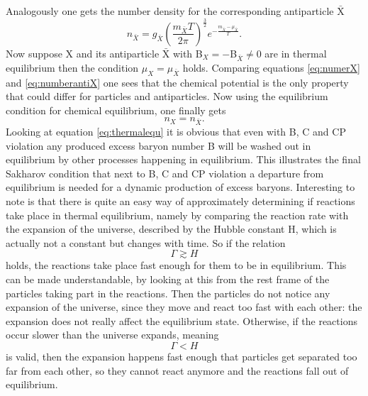 Analogously one gets the number density for the corresponding antiparticle $\bar{\text{X}}$
\begin{equation}
	n_{\bar{X}}=g_{\bar{X}}\left(\frac{m_{\bar{X}}T}{2\pi}\right)^\frac{3}{2}e^{-\frac{m_{\bar{X}}-\mu_{\bar{X}}}{T}}.
\label{eq:numberantiX}
\end{equation}
Now suppose X and its antiparticle $\bar{\text{X}}$  with B$_X=-$B$_{\bar{X}}\neq0$ are in thermal equilibrium then the condition $\mu_X=\mu_{\bar{X}}$ holds. Comparing equations \eqref{eq:numerX} and \eqref{eq:numberantiX} one sees that the chemical potential is the only property that could differ for particles and antiparticles. Now using the equilibrium condition for chemical equilibrium, one finally gets
\begin{equation}
	n_X=n_{\bar{X}}.
	\label{eq:thermalequ}
\end{equation}
Looking at equation \eqref{eq:thermalequ} it is obvious that even with B, C and CP violation any produced excess baryon number B will be washed out in equilibrium by other processes happening in equilibrium. \newline\indent
This illustrates the final Sakharov condition that next to B, C and CP violation a departure from equilibrium is needed for a dynamic production of excess baryons. \newline\indent
Interesting to note is that there is quite an easy way of approximately determining if reactions take place in thermal equilibrium, namely by comparing the reaction rate with the expansion of the universe, described by the Hubble constant H, which is actually not a constant but changes with time. So if the relation 
\begin{equation}
	\Gamma\gtrsim H
	\label{eq:rate_g_hubble}
\end{equation}
holds, the reactions take place fast enough for them to be in equilibrium. This can be made understandable, by looking at this from the rest frame of the particles taking part in the reactions. Then the particles do not notice any expansion of the universe, since they move and react too fast with each other: the expansion does not really affect the equilibrium state. \newline\indent
Otherwise, if the reactions occur slower than the universe expands, meaning
\begin{equation}
	\Gamma<H
	\label{eq:rate_s_hubble}
\end{equation}
is valid, then the expansion happens fast enough that particles get separated too far from each other, so they cannot react anymore and the reactions fall out of equilibrium.

